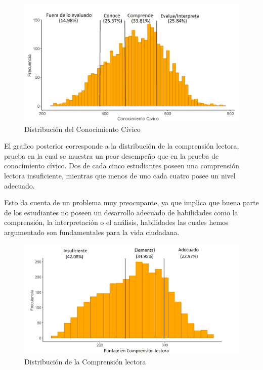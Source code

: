 \documentclass[12pt,twoside]{templates/facsothesis}
\begin{document}
\begin{figure}

{\centering \includegraphics[width=1.1\linewidth]{images/dist} 

}

\caption{Distribución del Conocimiento Cívico}\label{fig:unnamed-chunk-6}
\end{figure}

\newpage

El grafico posterior corresponde a la distribución de la comprensión lectora, prueba en la cual se muestra un peor desempeño que en la prueba de conocimiento cívico. Dos de cada cinco estudiantes poseen una comprensión lectora insuficiente, mientras que menos de uno cada cuatro posee un nivel adecuado.

Esto da cuenta de un problema muy preocupante, ya que implica que buena parte de los estudiantes no poseen un desarrollo adecuado de habilidades como la comprensión, la interpretación o el análisis, habilidades las cuales hemos argumentado son fundamentales para la vida ciudadana.

\begin{figure}

{\centering \includegraphics[width=1.1\linewidth]{images/dist2} 

}

\caption{Distribución de la Comprensión lectora}\label{fig:unnamed-chunk-7}
\end{figure}
\end{document}
